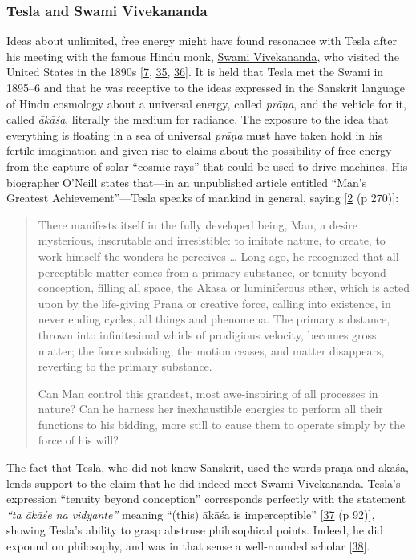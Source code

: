 \documentclass[
  a4paper,
]{article}
\begin{document}
\hypertarget{tesla-and-swami-vivekananda}{%
\subsubsection{Tesla and Swami
Vivekananda}\label{tesla-and-swami-vivekananda}}

Ideas about unlimited, free energy might have found resonance with Tesla
after his meeting with the famous Hindu monk,
\href{https://en.wikipedia.org/wiki/Swami_Vivekananda}{Swami
Vivekananda}, who visited the United States in the 1890s
{[}\protect\hyperlink{ref-tesla-home}{7},
\protect\hyperlink{ref-grotz}{35},
\protect\hyperlink{ref-dobson}{36}{]}. It is held that Tesla met the
Swami in 1895--6 and that he was receptive to the ideas expressed in the
Sanskrit language of Hindu cosmology about a universal energy, called
\emph{prāṇa}, and the vehicle for it, called \emph{ākāśa}, literally the
medium for radiance. The exposure to the idea that everything is
floating in a sea of universal \emph{prāṇa} must have taken hold in his
fertile imagination and given rise to claims about the possibility of
free energy from the capture of solar ``cosmic rays'' that could be used
to drive machines. His biographer O'Neill states that---in an
unpublished article entitled ``Man's Greatest Achievement''---Tesla
speaks of mankind in general, saying
{[}\protect\hyperlink{ref-oneill80}{2} (p 270){]}:

\begin{quote}
There manifests itself in the fully developed being, Man, a desire
mysterious, inscrutable and irresistible: to imitate nature, to create,
to work himself the wonders he perceives \ldots{} Long ago, he
recognized that all perceptible matter comes from a primary substance,
or tenuity beyond conception, filling all space, the Akasa or
luminiferous ether, which is acted upon by the life-giving Prana or
creative force, calling into existence, in never ending cycles, all
things and phenomena. The primary substance, thrown into infinitesimal
whirls of prodigious velocity, becomes gross matter; the force
subsiding, the motion ceases, and matter disappears, reverting to the
primary substance.

Can Man control this grandest, most awe-inspiring of all processes in
nature? Can he harness her inexhaustible energies to perform all their
functions to his bidding, more still to cause them to operate simply by
the force of his will?
\end{quote}

The fact that Tesla, who did not know Sanskrit, used the words prāṇa and
ākāśa, lends support to the claim that he did indeed meet Swami
Vivekananda. Tesla's expression ``tenuity beyond conception''
corresponds perfectly with the statement \emph{``ta ākāśe na vidyante''}
meaning ``(this) ākāśa is imperceptible''
{[}\protect\hyperlink{ref-agra01}{37} (p 92){]}, showing Tesla's ability
to grasp abstruse philosophical points. Indeed, he did expound on
philosophy, and was in that sense a well-rounded scholar
{[}\protect\hyperlink{ref-tesla-cosmic}{38}{]}.
\end{document}
